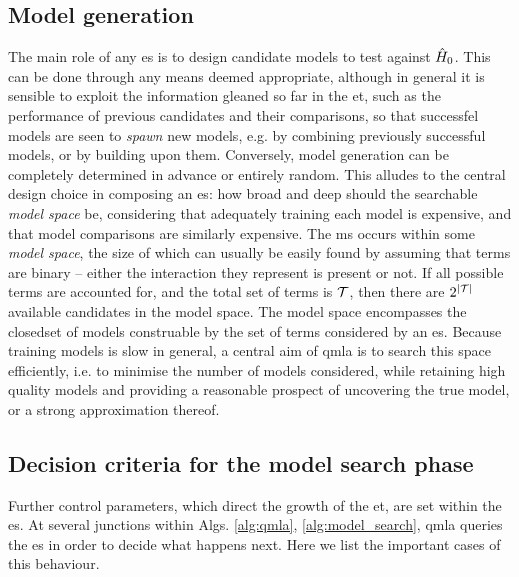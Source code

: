 \subsection{Model generation}\label{sec:model_generation}
The main role of any \gls{es} is to design candidate models to test against $\hat{H}_0$. 
This can be done through any means deemed appropriate, 
    although in general it is sensible to exploit the information gleaned so far in the \gls{et}, 
    such as the performance of previous candidates and their comparisons, 
    so that successfel models are seen to \emph{\gls{spawn}} new models, 
    e.g. by combining previously successful models, or by building upon them. 
Conversely, model generation can be completely determined in advance or entirely random.
This alludes to the central design choice in composing an \gls{es}: 
    how broad and deep should the searchable \emph{model space} be, 
    considering that adequately training each model
    is expensive, and that model comparisons are similarly expensive. 
The \gls{ms} occurs within some \emph{\gls{model space}}, the size of which can usually be easily found 
    by assuming that terms are binary -- either the interaction they represent is present or not. 
If all possible terms are accounted for, and the total set of terms is $\mathcal{T}$,
    then there are $2^{\left\lvert \mathcal{T} \right\rvert}$ available candidates in the model space. 
The model space encompasses the closed\footnotemark set of models construable by the set of terms considered by an \gls{es}. 
Because training models is slow in general,
    a central aim of \gls{qmla} is to search this space efficiently,
    i.e. to minimise the number of models considered, while retaining high quality models and 
    providing a reasonable prospect of uncovering the true model, or a strong approximation thereof. 




\subsection{Decision criteria for the model search phase}
Further control parameters, which direct the growth of the \gls{et}, are set within the \gls{es}.
At several junctions within Algs. \cref{alg:qmla}, \cref{alg:model_search}, 
    \gls{qmla} queries the \gls{es} in order to decide what happens next.
Here we list the important cases of this behaviour. 

